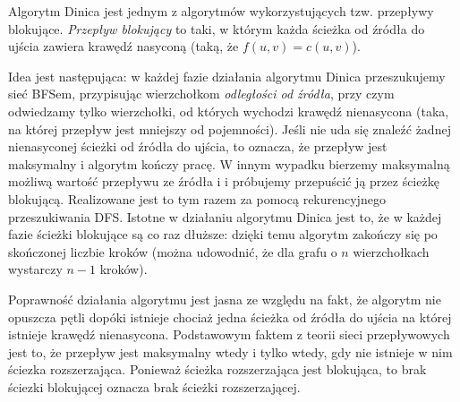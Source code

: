 \documentclass{article}
\begin{document}
Algorytm Dinica jest jednym z algorytmów wykorzystujących tzw. przepływy blokujące. \emph{Przepływ blokujący} to taki, w którym każda ścieżka od źródła do ujścia zawiera krawędź nasyconą (taką, że $f(u,v) = c(u,v)$).

Idea jest następująca: w każdej fazie działania algorytmu Dinica przeszukujemy sieć BFSem, przypisując wierzchołkom \emph{odległości od źródła}, przy czym odwiedzamy tylko wierzchołki, od których wychodzi krawędź nienasycona (taka, na której przepływ jest mniejszy od pojemności). Jeśli nie uda się znaleźć żadnej nienasyconej ścieżki od źródła do ujścia, to
oznacza, że przepływ jest maksymalny i algorytm kończy pracę. W innym wypadku bierzemy maksymalną możliwą wartość przepływu ze źródła i i próbujemy przepuścić ją przez ścieżkę blokującą. Realizowane jest to tym razem za pomocą rekurencyjnego przeszukiwania DFS. Istotne w działaniu algorytmu Dinica jest to, że w każdej fazie ścieżki blokujące są co raz dłuższe: dzięki temu algorytm zakończy się po skończonej liczbie kroków (można udowodnić, że dla grafu o $n$ wierzchołkach wystarczy $n-1$ kroków).

Poprawność działania  algorytmu jest jasna ze względu na fakt, że algorytm nie opuszcza pętli dopóki istnieje chociaż jedna ścieżka od źródła do ujścia na której istnieje krawędź nienasycona. Podstawowym faktem z teorii sieci przepływowych jest to, że przepływ jest maksymalny wtedy i tylko wtedy, gdy nie istnieje w nim ściezka rozszerzająca. Ponieważ ścieżka rozszerzająca jest blokująca, to brak ściezki blokującej oznacza brak ścieżki rozszerzającej. 
\end{document}

